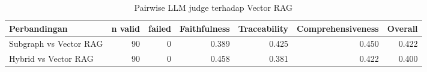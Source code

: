 \begin{table}[htbp]
    \centering
    \small
    \caption{Pairwise LLM judge terhadap Vector RAG}
    \label{tab:bab4-llm-judge}
    \begin{tabular}{lrrrrrr}
        \toprule
        Perbandingan & n valid & failed & Faithfulness & Traceability & Comprehensiveness & Overall \\
        \midrule
        Subgraph vs Vector RAG & 90 & 0 & 0.389 & 0.425 & 0.450 & 0.422 \\
        Hybrid vs Vector RAG & 90 & 0 & 0.458 & 0.381 & 0.422 & 0.400 \\
        \bottomrule
    \end{tabular}
\end{table}
